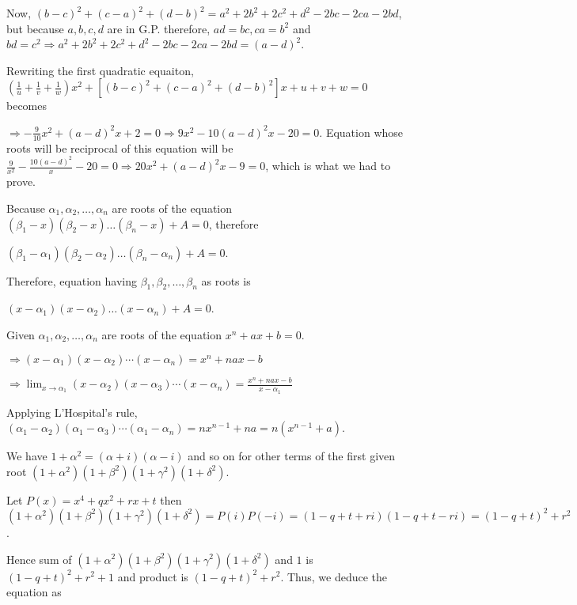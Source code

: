   Now, $(b - c)^2 + (c - a)^2 + (d - b)^2 = a^2 + 2b^2 + 2c^2 + d^2 - 2bc - 2ca - 2bd$, but because $a, b,
  c, d$ are in G.P. therefore, $ad = bc, ca = b^2$ and $bd = c^2\Rightarrow a^2 + 2b^2 + 2c^2 + d^2 - 2bc -
  2ca - 2bd = (a - d)^2$.

  Rewriting the first quadratic equaiton, $\left(\frac{1}{u} + \frac{1}{v} + \frac{1}{w}\right)x^2 +[(b - c)^2 + (c -
    a)^2 + (d - b)^2]x + u + v + w = 0$ becomes

  $\Rightarrow -\frac{9}{10}x^2 + (a - d)^2x + 2 = 0 \Rightarrow 9x^2 - 10(a - d)^2x - 20 = 0$. Equation
  whose roots will be reciprocal of this equation will be $\frac{9}{x^2} - \frac{10(a - d)^2}{x} - 20 =
  0\Rightarrow 20x^2 + (a - d)^2x - 9 = 0$, which is what we had to prove.
\item Because $\alpha_1, \alpha_2, \ldots, \alpha_n$ are roots of the equation $(\beta_1 - x)(\beta_2 -
  x)\ldots (\beta_n - x) + A = 0$, therefore

  $(\beta_1 - \alpha_1)(\beta_2 - \alpha_2)\ldots (\beta_n - \alpha_n) + A = 0$.

  Therefore, equation having $\beta_1, \beta_2, \ldots, \beta_n$ as roots is

  $(x - \alpha_1)(x - \alpha_2)\ldots(x - \alpha_n) + A = 0$.
\item Given $\alpha_1, \alpha_2, \ldots, \alpha_n$ are roots of the equation $x^n + ax + b = 0$.

  $\Rightarrow (x - \alpha_1)(x - \alpha_2)\cdots(x - \alpha_n) = x^n + nax - b$

  $\displaystyle\Rightarrow \lim_{x\to\alpha_1}(x - \alpha_2)(x - \alpha_3)\cdots(x - \alpha_n) = \frac{x^n
  + nax - b}{x - \alpha_1}$

  Applying L'Hospital's rule, $(\alpha_1 - \alpha_2)(\alpha_1 - \alpha_3)\cdots(\alpha_1 - \alpha_n) = nx^{n
    - 1} + na = n(x^{n - 1} + a)$.
\item We have $1 + \alpha^2 = (\alpha + i)(\alpha - i)$ and so on for other terms of the first given root
  $(1 + \alpha^2)(1 + \beta^2)(1 + \gamma^2)(1 + \delta^2)$.

  Let $P(x) = x^4 + qx^2 + rx + t$ then $(1 + \alpha^2)(1 + \beta^2)(1 + \gamma^2)(1 + \delta^2) = P(i)P(-i)
  = (1 - q + t + ri)(1 - q + t - ri) = (1 - q + t)^2 + r^2$.

  Hence sum of $(1 + \alpha^2)(1 + \beta^2)(1 + \gamma^2)(1 + \delta^2)$ and $1$ is $(1 - q + t)^2 + r^2 +
  1$ and product is $(1 - q + t)^2 + r^2$. Thus, we deduce the equation as

